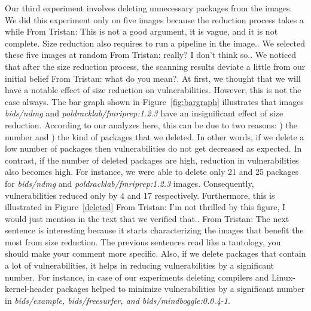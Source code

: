 \documentclass[a4paper,num-refs]{oup-contemporary}
\newcommand{\rom}[1]{\lowercase\expandafter{\romannumeral #1\relax}}
\newcommand{\tristan}[1]{\color{blue}From Tristan: #1\color{black}}
\begin{document}
Our third experiment involves deleting unnecessary packages from the images.
We did this experiment only on five images because the reduction process takes a
while \tristan{This is not a good argument, it is vague, and it is not complete. Size reduction also requires 
to run a pipeline in the image.}. We selected these five images at random \tristan{really? I don't think so.}. We noticed that
after the size reduction process, the scanning results deviate a little from our initial belief \tristan{what do you mean?}.
At first, we thought that we will have a notable effect of size reduction on
vulnerabilities. However, this is not the case always. The bar graph shown in
Figure~\ref{fig:bargraph} illustrates that images \textit{bids/ndmg} and
\textit{poldracklab/fmriprep:1.2.3} have an insignificant effect of size reduction.
According to our analyzes here, this can be due to two reasons: \rom{1}) the number
and \rom{2}) the kind of packages that we deleted. In other
words, if we delete a low number of packages then vulnerabilities do not get decreased as expected.
In contrast, if the number of deleted packages are high, reduction
in vulnerabilities also becomes high. For instance, we were able to delete only 21 and 25 packages for 
\textit{bids/ndmg} and \textit{poldracklab/fmriprep:1.2.3} images. Consequently, vulnerabilities
reduced only by 4 and 17 respectively. Furthermore, this is illustrated in Figure~\ref{deleted} \tristan{I'm not thrilled by this figure, I would 
just mention in the text that we verified that.}.
\tristan{The next sentence is interesting because it starts characterizing the images that benefit the most 
from size reduction. The previous sentences read like a tautology, you should make your comment more specific.} 
Also, if we delete packages that contain a lot of vulnerabilities, it helps in reducing
vulnerabilities by a significant number. For instance, in case of our experiments
deleting compilers and Linux-kernel-header packages helped to minimize vulnerabilities
by a significant number in \textit{bids/example, bids/freesurfer, and bids/mindboggle:0.0.4-1}. 
\end{document}
